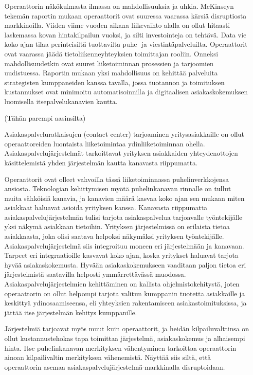 \documentclass[finnish,12pt,a4paper,pdftex]{article}
\begin{document}
Operaattorin näkökulmasta ilmassa on mahdollisuuksia ja uhkia. McKinseyn tekemän raportin mukaan operaattorit ovat suuressa vaarassa kärsiä disruptiosta markkinoilla. Viiden viime vuoden aikana liikevaihto alalla on ollut hitaasti laskemassa kovan hintakilpailun vuoksi, ja silti investointeja on tehtävä. Data vie koko ajan tilaa perinteisiltä tuottavilta puhe- ja viestintäpalveluilta. Operaattorit ovat vaarassa jäädä tietoliikenneyhteyksien toimittajan rooliin. Onneksi mahdollisuudetkin ovat suuret liiketoiminnan prosessien ja tarjoomien uudistuessa. Raportin mukaan yksi mahdollisuus on kehittää palveluita strategisten kumppaneiden kanssa tavalla, jossa tuotannon ja toimituksen kustannukset ovat minimoitu automatisoinnilla ja digitaalisen asiakaskokemuksen luomisella itsepalvelukanavien kautta.\citep{mckinseytele}

(Tähän parempi aasinsilta)

Asiakaspalveluratkaisujen (contact center) tarjoaminen yritysasiakkaille on ollut operaattoreiden luontaista liiketoimintaa ydinliiketoiminnan ohella. Asiakaspalvelujärjestelmät tarkoittavat yrityksen asiakkaiden yhteydenottojen käsittelemistä yhden järjestelmän kautta kanavasta riippumatta.

Operaattorit ovat olleet vahvoilla tässä liiketoiminnassa puhelinverkkojensa ansiosta. Teknologian kehittymisen myötä puhelinkanavan rinnalle on tullut muita sähköisiä kanavia, ja kanavien määrä kasvaa koko ajan sen mukaan miten asiakkaat haluavat asioida yrityksen kanssa. Kanavasta riippumatta asiakaspalvelujärjestelmän tulisi tarjota asiakaspalvelua tarjoavalle työntekijälle yksi näkymä asiakkaan tietoihin. Yrityksen järjestelmissä on erilaista tietoa asiakkaasta, joka olisi saatava helpoksi näkymäksi yrityksen työntekijälle. Asiakaspalvelujärjestelmä siis integroituu moneen eri järjestelmään ja kanavaan. Tarpeet eri integraatioille kasvavat koko ajan, koska yritykset haluavat tarjota hyvää asiakaskokemusta. Hyvään asiakaskokemukseen vaaditaan paljon tietoa eri järjestelmistä saatavilla helposti ymmärrettävässä muodossa. Asiakaspalvelujärjestelmien kehittäminen on kallista ohjelmistokehitystä, joten operaattorin on ollut helpompi tarjota valitun kumppanin tuotetta asiakkaille ja keskittyä ydinosaamiseensa, eli yhteyksien rakentamiseen asiakastoimituksissa, ja jättää itse järjestelmän kehitys kumppanille. 

Järjestelmiä tarjoavat myös muut kuin operaattorit, ja heidän kilpailuvalttinsa on ollut kustannustehokas tapa toimittaa järjestelmä, asiakaskokemus ja alhaisempi hinta. Itse puhelinkanavan merkityksen vähentyminen tarkoittaa operaattorin ainoan kilpailivaltin merkityksen vähenemistä. Näyttää siis siltä, että operaattorin asemaa asiakaspalvelujärjestelmä-markkinalla disruptoidaan. 
\end{document}
